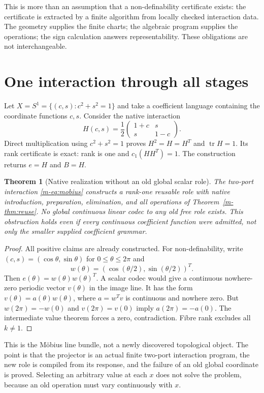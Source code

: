 \documentclass[11pt]{article}
\newtheorem{theorem}{Theorem}[section]
\theoremstyle{definition}
\theoremstyle{remark}
\newcommand{\tr}{\operatorname{tr}}
\begin{document}
This is more than an assumption that a non-definability certificate exists: the certificate is extracted by a finite algorithm from locally checked interaction data. The geometry supplies the finite charts; the algebraic program supplies the operations; the sign calculation answers representability. These obligations are not interchangeable.

\section{One interaction through all stages}\label{sec:mobius}
Let $X=S^1=\{(c,s):c^2+s^2=1\}$ and take a coefficient language containing the coordinate functions $c,s$. Consider the native interaction
\begin{equation}\label{m-eq:mobius}
 H(c,s)=\frac12
 \begin{pmatrix}
  1+c&s\\ s&1-c
 \end{pmatrix}.
\end{equation}
Direct multiplication using $c^2+s^2=1$ proves $H^2=H=H^T$ and $\tr H=1$. Its rank certificate is exact: rank is one and $c_1(HH^T)=1$. The construction returns $e=H$ and $B=H$.

\begin{theorem}[Native realization without an old global scalar role]\label{m-thm:mobius}
The two-port interaction \eqref{m-eq:mobius} constructs a rank-one reusable role with native introduction, preparation, elimination, and all operations of Theorem~\ref{m-thm:reuse}. No global continuous linear codec to any old free role exists. This obstruction holds even if every continuous coefficient function were admitted, not only the smaller supplied coefficient grammar.
\end{theorem}
\begin{proof}
All positive claims are already constructed. For non-definability, write $(c,s)=(\cos\theta,\sin\theta)$ for $0\le\theta\le2\pi$ and
\[
 w(\theta)=(\cos(\theta/2),\sin(\theta/2))^T.
\]
Then $e(\theta)=w(\theta)w(\theta)^T$. A scalar codec would give a continuous nowhere-zero periodic vector $v(\theta)$ in the image line. It has the form $v(\theta)=a(\theta)w(\theta)$, where $a=w^Tv$ is continuous and nowhere zero. But $w(2\pi)=-w(0)$ and $v(2\pi)=v(0)$ imply $a(2\pi)=-a(0)$. The intermediate value theorem forces a zero, contradiction. Fibre rank excludes all $k\ne1$.
\end{proof}

This is the M\"obius line bundle, not a newly discovered topological object. The point is that the projector is an actual finite two-port interaction program, the new role is compiled from its response, and the failure of an old global coordinate is proved. Selecting an arbitrary value at each $x$ does not solve the problem, because an old operation must vary continuously with $x$.
\end{document}
